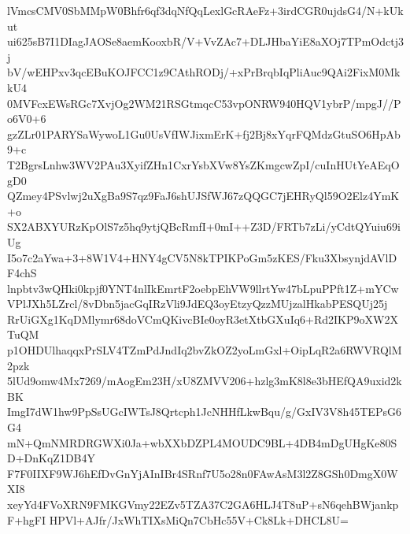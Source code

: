 lVmcsCMV0SbMMpW0Bhfr6qf3dqNfQqLexlGcRAeFz+3irdCGR0ujdsG4/N+kUkut
ui625sB7I1DIagJAOSe8aemKooxbR/V+VvZAc7+DLJHbaYiE8aXOj7TPmOdctj3j
bV/wEHPxv3qcEBuKOJFCC1z9CAthRODj/+xPrBrqbIqPliAuc9QAi2FixM0MkkU4
0MVFcxEWsRGc7XvjOg2WM21RSGtmqcC53vpONRW940HQV1ybrP/mpgJ//Po6V0+6
gzZLr01PARYSaWywoL1Gu0UsVfIWJixmErK+fj2Bj8xYqrFQMdzGtuSO6HpAb9+c
T2BgrsLnhw3WV2PAu3XyifZHn1CxrYsbXVw8YsZKmgcwZpI/cuInHUtYeAEqOgD0
QZmey4PSvlwj2uXgBa9S7qz9FaJ6shUJSfWJ67zQQGC7jEHRyQl59O2Elz4YmK+o
SX2ABXYURzKpOlS7z5hq9ytjQBcRmfI+0mI++Z3D/FRTb7zLi/yCdtQYuiu69iUg
I5o7c2aYwa+3+8W1V4+HNY4gCV5N8kTPIKPoGm5zKES/Fku3XbsynjdAVlDF4chS
lnpbtv3wQHki0kpjf0YNT4nlIkEmrtF2oebpEhVW9llrtYw47bLpuPPft1Z+mYCw
VPlJXh5LZrcl/8vDbn5jacGqIRzVli9JdEQ3oyEtzyQzzMUjzalHkabPESQUj25j
RrUiGXg1KqDMlymr68doVCmQKivcBIe0oyR3etXtbGXuIq6+Rd2IKP9oXW2XTuQM
p1OHDUlhaqqxPrSLV4TZmPdJndIq2bvZkOZ2yoLmGxl+OipLqR2a6RWVRQlM2pzk
5lUd9omw4Mx7269/mAogEm23H/xU8ZMVV206+hzlg3mK8l8e3bHEfQA9uxid2kBK
ImgI7dW1hw9PpSsUGcIWTsJ8Qrtcph1JcNHHfLkwBqu/g/GxIV3V8h45TEPsG6G4
mN+QmNMRDRGWXi0Ja+wbXXbDZPL4MOUDC9BL+4DB4mDgUHgKe80SD+DnKqZ1DB4Y
F7F0IIXF9WJ6hEfDvGnYjAInIBr4SRnf7U5o28n0FAwAsM3l2Z8GSh0DmgX0WXI8
xeyYd4FVoXRN9FMKGVmy22EZv5TZA37C2GA6HLJ4T8uP+sN6qehBWjankpF+hgFI
HPVl+AJfr/JxWhTIXsMiQn7CbHc55V+Ck8Lk+DHCL8U=
